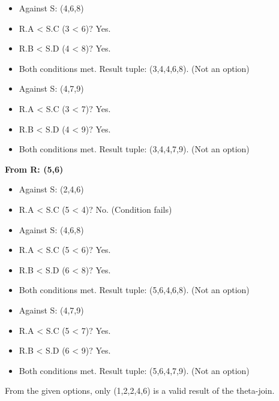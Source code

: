 \documentclass{article}
\begin{document}
\begin{enumerate}[label=\textbf{Question \arabic*.}]
\begin{itemize}
\begin{itemize}
            \item Against S: (4,6,8)
                \item R.A < S.C (3 < 6)? Yes.
                \item R.B < S.D (4 < 8)? Yes.
                \item Both conditions met. Result tuple: (3,4,4,6,8). (Not an option)

            \item Against S: (4,7,9)
                \item R.A < S.C (3 < 7)? Yes.
                \item R.B < S.D (4 < 9)? Yes.
                \item Both conditions met. Result tuple: (3,4,4,7,9). (Not an option)
        \end{itemize}

        \textbf{From R: (5,6)}
        \begin{itemize}
            \item Against S: (2,4,6)
                \item R.A < S.C (5 < 4)? No. (Condition fails)

            \item Against S: (4,6,8)
                \item R.A < S.C (5 < 6)? Yes.
                \item R.B < S.D (6 < 8)? Yes.
                \item Both conditions met. Result tuple: (5,6,4,6,8). (Not an option)

            \item Against S: (4,7,9)
                \item R.A < S.C (5 < 7)? Yes.
                \item R.B < S.D (6 < 9)? Yes.
                \item Both conditions met. Result tuple: (5,6,4,7,9). (Not an option)
        \end{itemize}
        From the given options, only (1,2,2,4,6) is a valid result of the theta-join.
    \end{itemize}

\end{enumerate}
\end{document}

